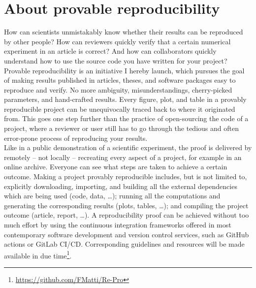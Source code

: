 \chapter*{About provable reproducibility}
\label{chp:0-reproducibility}

How can scientists unmistakably know whether their results can be reproduced
by other people? How can reviewers quickly verify that a certain numerical
experiment in an article is correct? And how can collaborators quickly
understand how to use the source code you have written for your project?\\

Provable reproducibility is an initiative I hereby launch, which pursues the
goal of making results published in articles, theses, and software packages easy to
reproduce and verify. No more ambiguity, misunderstandings, cherry-picked
parameters, and hand-crafted results. Every figure, plot, and table
in a provably reproducible project can be unequivocally traced back to where
it originated from. This goes one step further than the practice of open-sourcing
the code of a project, where a reviewer or user still has to go through the
tedious and often error-prone process of reproducing your results.\\

Like in a public demonstration of a scientific experiment, the proof is delivered
by remotely -- not locally -- recreating every aspect of a project, for example
in an online archive. Everyone can see what steps are taken to achieve a certain outcome.
Making a project provably reproducible includes, but is not limited to,
explicitly downloading, importing, and building all the external dependencies which are being used (code, data, \dots);
running all the computations and generating the corresponding results (plots, tables, \dots);
and compiling the project outcome (article, report, \dots).
A reproducibility proof can be achieved without too much effort by
using the continuous integration frameworks offered in most contemporary
software development and version control services, such as GitHub actions or
GitLab CI/CD. Corresponding guidelines and resources will be made available in due
time\footnote{\url{https://github.com/FMatti/Re-Pro}}.

